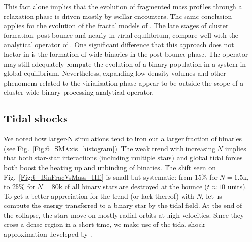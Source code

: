 This fact alone implies that the evolution of fragmented mass profiles through a relaxation phase is driven mostly by stellar encounters. The same conclusion applies for the evolution of the  fractal models of \cite{Parker2011}. 
The late stages of cluster formation, post-bounce and nearly in virial equilibrium, compare well with the 
analytical operator  of \cite{Marks2012}. One significant difference that this approach does not factor in is the formation of wide binaries in the post-bounce phase. The operator may still adequately compute  the evolution of a binary population in a system in global  equilibrium. Nevertheless, expanding low-density volumes and other phenomena related to the virialisation phase appear to be outside the scope of a cluster-wide binary-processing analytical  operator. 


\subsection{Tidal shocks} 
\label{Sec:6_tidal}


We noted how larger-N simulations tend to iron out a larger fraction of binaries (see Fig.~\ref{Fig:6_SMAxis_histogram}). 
The weak trend with increasing $N$ implies that both star-star interactions (including multiple stars) and global tidal forces both boost the heating up and unbinding of  binaries.  The shift seen on Fig.~\ref{Fig:6_BinFracVsMass_HD} is small but systematic: from 15\% for $N = 1.5$k, to 25\% for $N = 80$k of all binary stars are destroyed at the bounce ($t \approx 10 $ units).  To get a better appreciation for the trend (or lack thereof) with $N$, let us compute the energy transferred to a binary star by the tidal field. At the end of the collapse, the stars move on mostly radial orbits at high velocities. Since they cross a dense region in a short time, we make use of the tidal shock approximation developed by \citet[see also \citealt{Boily2004,BT}]{Spitzer1958}.


